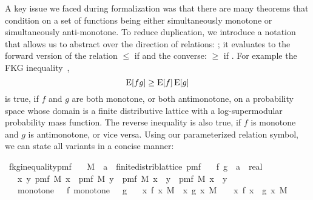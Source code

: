 A key issue we faced during formalization was that there are many theorems that condition on a set of functions being either simultaneously monotone or simultaneously anti-monotone.
To reduce duplication, we introduce a notation that allows us to abstract over the direction of relations: \isa{\isasymle\isasymge\isactrlbsub\isasymeta\isactrlesub}; it evaluates to the forward version of the relation $\leq$ if  and the converse: $\geq$ if .
For example the FKG inequality~\cite[Ch. 6]{alon2000},\cite{fortuin1971}
\[
  \operatorname{\mathrm{E}} [f g] \geq \operatorname{\mathrm{E}} [f] \operatorname{\mathrm{E}} [g]
\]
is true, if $f$ and $g$ are both monotone, or both antimonotone, on a probability space whose domain is a finite distributive lattice with a log-supermodular probability mass function.
The reverse inequality is also true, if $f$ is monotone and $g$ is antimonotone, or vice versa.
Using our parameterized relation symbol, we can state all variants in a concise manner:
\begin{isabelle_cm}
\isamarkupfalse%
\ fkg{\isacharunderscore}{\kern0pt}inequality{\isacharunderscore}{\kern0pt}pmf{\isacharcolon}{\kern0pt}\isanewline
\ \ \ M\ {\isacharcolon}{\kern0pt}{\isacharcolon}{\kern0pt}\ {\isacartoucheopen}{\isacharparenleft}{\kern0pt}{\isacharprime}{\kern0pt}a\ {\isacharcolon}{\kern0pt}{\isacharcolon}{\kern0pt}\ finite{\isacharunderscore}{\kern0pt}distrib{\isacharunderscore}{\kern0pt}lattice{\isacharparenright}{\kern0pt}\ pmf{\isacartoucheclose}\isanewline
\ \ \ f\ g\ {\isacharcolon}{\kern0pt}{\isacharcolon}{\kern0pt}\ {\isacartoucheopen}{\isacharprime}{\kern0pt}a\ {\isasymRightarrow}\ real{\isacartoucheclose}\isanewline
\ \ \ {\isacartoucheopen}{\isasymAnd}x\ y{\isachardot}{\kern0pt}\ pmf\ M\ x\ {\isacharasterisk}{\kern0pt}\ pmf\ M\ y\ {\isasymle}\ pmf\ M\ {\isacharparenleft}{\kern0pt}x\ {\isasymsqunion}\ y{\isacharparenright}{\kern0pt}\ {\isacharasterisk}{\kern0pt}\ pmf\ M\ {\isacharparenleft}{\kern0pt}x\ {\isasymsqinter}\ y{\isacharparenright}{\kern0pt}{\isacartoucheclose}\isanewline
\ \ \ {\isacartoucheopen}monotone\ {\isacharparenleft}{\kern0pt}{\isasymle}{\isacharparenright}{\kern0pt}\ {\isacharparenleft}{\kern0pt}{\isasymle}{\isasymge}\isactrlbsub {\isasymtau}\isactrlesub {\isacharparenright}{\kern0pt}\ f{\isacartoucheclose}\ {\isacartoucheopen}monotone\ {\isacharparenleft}{\kern0pt}{\isasymle}{\isacharparenright}{\kern0pt}\ {\isacharparenleft}{\kern0pt}{\isasymle}{\isasymge}\isactrlbsub {\isasymsigma}\isactrlesub {\isacharparenright}{\kern0pt}\ g{\isacartoucheclose}\isanewline
\ \ \ {\isacartoucheopen}{\isacharparenleft}{\kern0pt}{\isasymintegral}x{\isachardot}{\kern0pt}\ f\ x\ {\isasympartial}M{\isacharparenright}{\kern0pt}\ {\isacharasterisk}{\kern0pt}\ {\isacharparenleft}{\kern0pt}{\isasymintegral}x{\isachardot}{\kern0pt}\ g\ x\ {\isasympartial}M{\isacharparenright}{\kern0pt}\ {\isasymle}{\isasymge}\isactrlbsub {\isasymtau}\ {\isacharasterisk}{\kern0pt}\ {\isasymsigma}\isactrlesub \ {\isacharparenleft}{\kern0pt}{\isasymintegral}x{\isachardot}{\kern0pt}\ f\ x\ {\isacharasterisk}{\kern0pt}\ g\ x\ {\isasympartial}M{\isacharparenright}{\kern0pt}{\isacartoucheclose}
\end{isabelle_cm}
